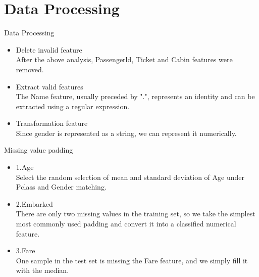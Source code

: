 \documentclass[
 size=14pt,
 paper=smartboard,  %
 mode=present, 		%
 display=slides, 	%
 style=tuliplab,  	%
 pauseslide,
 fleqn,leqno]{powerdot}
\begin{document}
\section{Data Processing}



\begin{slide}{Data Processing}

\begin{center}
\begin{itemize}

\item
\smallskip
\large
{Delete invalid feature\\
After the above analysis, Passengerld, Ticket and Cabin features were removed.\\
}
\item
\smallskip
\large
{Extract valid features\\
The Name feature, usually preceded by ".", represents an identity and can be extracted using a regular expression.\\
}
\item
\smallskip
\large
{Transformation feature\\
Since gender is represented as a string, we can represent it numerically.\\
}

\end{itemize}
\end{center}

\end{slide}



\begin{slide}{Missing value padding}

\begin{center}
\begin{itemize}

\item
\smallskip
\large
{1.Age\\
Select the random selection of mean and standard deviation of Age under Pclass and Gender matching.\\
}
\item
\smallskip
\large
{2.Embarked\\
There are only two missing values in the training set, so we take the simplest most commonly used padding and convert it into a classified numerical feature.\\
}
\item
\smallskip
\large
{3.Fare\\
One sample in the test set is missing the Fare feature, and we simply fill it with the median.\\
}

\end{itemize}
\end{center}

\end{slide}
\end{document}
